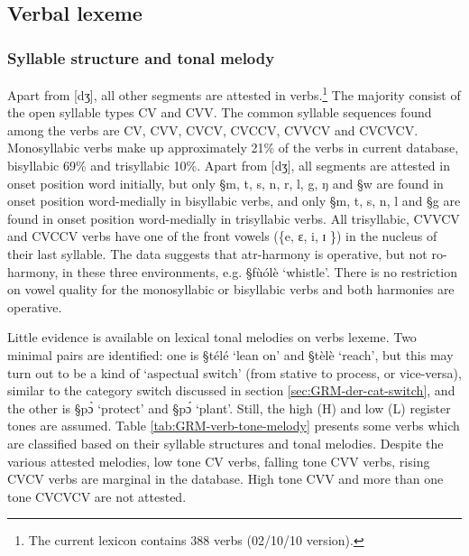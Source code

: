 % 



\subsection{Verbal lexeme}
\label{sec:GRM-verb-lexeme}


\subsubsection{Syllable structure and tonal melody}
\label{sec:GRM-verb-syll-und-tone}

 Apart from [dʒ], all other segments  are attested in
verbs.\footnote{The current lexicon contains 388 verbs  (02/10/10 version).} The
majority consist of the open syllable types CV and CVV. The  common
syllable sequences found among the verbs are CV, CVV, CVCV, CVCCV,
CVVCV and CVCVCV.  Monosyllabic verbs make up approximately 21\% of the verbs in
current database, bisyllabic 69\% and trisyllabic  10\%. Apart  from [dʒ], all
segments are attested in onset position word initially, but only {\S m, t, s, n,
r, l, g, ŋ} and {\S w} are found in onset position word-medially in bisyllabic
verbs, and only {\S  m, t, s, n,  l} and {\S g} are found  in onset position
word-medially in trisyllabic verbs.   All trisyllabic, CVVCV  and CVCCV verbs
have one of the front vowels (\{e, ɛ, i, ɪ \}) in the nucleus of their last
syllable.  The data suggests that {\sc atr}-harmony is operative, but not   {\sc
ro}-harmony, in these three environments, e.g. {\S fùólè} `whistle'. 
There
is no restriction on vowel quality for the monosyllabic or bisyllabic verbs
and both harmonies are operative.


Little evidence is available on lexical tonal melodies on verbs lexeme. Two
minimal pairs are identified:  one is {\S télé} `lean on' and {\S tèlè}
`reach', but this may turn out to be a kind of  `aspectual switch' (from stative
to
process, or vice-versa), similar to the category switch discussed in section
\ref{sec:GRM-der-cat-switch}, and the other is {\S pɔ̀} `protect' and  {\S pɔ́}
`plant'.  Still, the high (H) and low (L) register tones are assumed. Table
\ref{tab:GRM-verb-tone-melody} presents some verbs which are classified based on
their syllable structures and  tonal melodies.  Despite the various attested
melodies, low tone CV verbs,   falling tone CVV verbs,   rising CVCV verbs
are marginal in the database. High tone CVV and more than one tone CVCVCV are
not attested.




